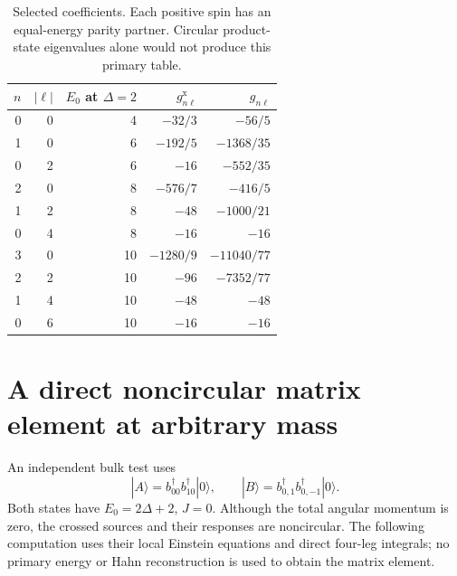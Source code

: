 \documentclass[11pt,a4paper]{article}
\numberwithin{equation}{section}
\theoremstyle{remark}\newtheorem{remark}[theorem]{Remark}
\begin{document}
\begin{table}[ht]
\centering
\begin{tabular}{rrrrr}
\toprule
$n$ & $|\ell|$ & $E_0$ at $\Delta=2$ & $g^{\mathrm x}_{n\ell}$ & $g_{n\ell}$\\
\midrule
0&0&4&$-32/3$&$-56/5$\\
1&0&6&$-192/5$&$-1368/35$\\
0&2&6&$-16$&$-552/35$\\
2&0&8&$-576/7$&$-416/5$\\
1&2&8&$-48$&$-1000/21$\\
0&4&8&$-16$&$-16$\\
3&0&10&$-1280/9$&$-11040/77$\\
2&2&10&$-96$&$-7352/77$\\
1&4&10&$-48$&$-48$\\
0&6&10&$-16$&$-16$\\
\bottomrule
\end{tabular}
\caption{Selected coefficients. Each positive spin has an equal-energy parity partner. Circular product-state eigenvalues alone would not produce this primary table.}
\label{tab:spectrum}
\end{table}

\section{A direct noncircular matrix element at arbitrary mass}
\label{sec:noncircular}

An independent bulk test uses
\begin{equation}
 |A\rangle=b_{00}^\dagger b_{10}^\dagger|0\rangle,
 \qquad |B\rangle=b_{0,1}^\dagger b_{0,-1}^\dagger|0\rangle.
 \label{eq:ABstates}
\end{equation}
Both states have $E_0=2\Delta+2$, $J=0$. Although the total angular momentum is zero, the crossed sources and their responses are noncircular. The following computation uses their local Einstein equations and direct four-leg integrals; no primary energy or Hahn reconstruction is used to obtain the matrix element.
\end{document}
